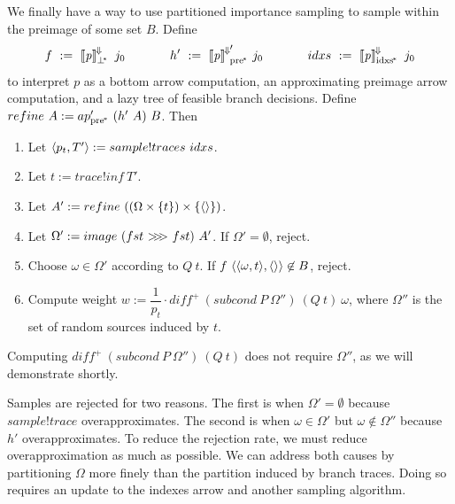 We finally have a way to use partitioned importance sampling to sample within the preimage of some set $B$.
Define
\begin{equation}
	f\ :=\ \meaningofconv{\mathit{p}}_\pbot~j_0
\hspace{0.5in}
	h'\ :=\ {\meaningofconv{\mathit{p}}}'\ppre~j_0
\hspace{0.5in}
	idxs\ :=\ \meaningofconv{\mathit{p}}\pbi~j_0
\end{equation}
to interpret $\mathit{p}$ as a bottom arrow computation, an approximating preimage arrow computation, and a lazy tree of feasible branch decisions.
Define $refine~A := ap_\mathrm{pre^{\mspace{-2mu}*}}'~(h'~A)~B$.
Then
\begin{enumerate}
	\item Let $\langle{p_t,T'}\rangle := sample!traces~idxs$.
	\item Let $t := trace!inf~T'$.
	\item Let $A' := refine~((\Omega \times \{{t}\}) \times \{{\langle{}\rangle}\})$.
	\item Let $\Omega' := image~(fst~{>}\mspace{-6mu}{>}\mspace{-6mu}{>}~fst)~A'$. If $\Omega' = \emptyset$, reject.
	\item Choose $\omega \in \Omega'$ according to $Q~t$. If $f~\langle{\langle{\omega,t}\rangle,\langle{}\rangle}\rangle \not\in B$, reject.
	\item Compute weight $w := \dfrac{1}{p_t} \cdot diff^+~(subcond~P~\Omega'')~(Q~t)~\omega$, where $\Omega''$ is the set of random sources induced by $t$.
\end{enumerate}
Computing $diff^+~(subcond~P~\Omega'')~(Q~t)$ does not require $\Omega''$, as we will demonstrate shortly.

Samples are rejected for two reasons.
The first is when $\Omega' = \emptyset$ because $sample!trace$ overapproximates.
The second is when $\omega \in \Omega'$ but $\omega \notin \Omega''$ because $h'$ overapproximates.
To reduce the rejection rate, we must reduce overapproximation as much as possible.
We can address both causes by partitioning $\Omega$ more finely than the partition induced by branch traces.
Doing so requires an update to the indexes arrow and another sampling algorithm.

